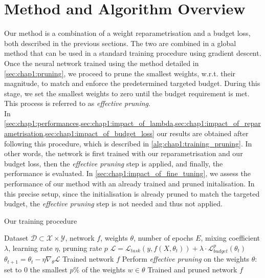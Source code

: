
\section{Method and Algorithm Overview}
\label{sec:chap1:overview}
Our method is a combination of a weight reparametrisation and a budget loss,
both described in the previous sections. The two are combined in a global method
that can be used in a standard training procedure using gradient descent. Once
the neural network trained using the method detailed in
\cref{sec:chap1:pruning}, we proceed to prune the smallest weights, w.r.t. their
magnitude, to match and enforce the predetermined targeted budget. During this
stage, we set the smallest weights to zero until the budget requirement is met.
This process is referred to as \textit{effective pruning}.\\

In
\cref{sec:chap1:performances,sec:chap1:impact_of_lambda,sec:chap1:impact_of_reparametrisation,sec:chap1:impact_of_budget_loss}
our results are obtained after following this procedure, which is described in
\cref{alg:chap1:training_pruning}. In other words, the network is first trained
with our reparametrisation and our budget loss, then the \textit{effective
  pruning} step is applied, and finally, the performance is evaluated. In
\cref{sec:chap1:impact_of_fine_tuning}, we assess the performance of our method
with an already trained and pruned initalisation. In this precise setup, since
the initialisation is already pruned to match the targeted budget, the
\emph{effective pruning} step is not needed and thus not applied.\\

\begin{algorithm}
  \caption{Our training procedure}
  \label{alg:chap1:training_pruning}
  \begin{algorithmic}
    \REQUIRE Dataset $\mathcal{D} \subset \mathcal{X} \times \mathcal{Y}$, network $f$,
    weights $\theta$, number of epochs $E$, mixing coefficient $\lambda$, learning
    rate $\eta$, pruning rate $p$
    \STATE $\mathcal{L}= \mathcal{L}_{task}(y, f(X, \theta_t)) + \lambda \cdot
      \mathcal{L}^{p}_{budget}(\theta_t )$ 
    \STATE $\theta_{t+1} = \theta_t - \eta \nabla_{\theta} \mathcal{L}$ 
    \ENDFOR
    \ENDFOR
    \RETURN Trained network $f$
    \STATE Perform \emph{effective pruning} on the weights $\theta$: set to 0 the
    smallest $p$\% of the weights $w\in\theta$
    \RETURN Trained and pruned network $f$
  \end{algorithmic}
\end{algorithm}


